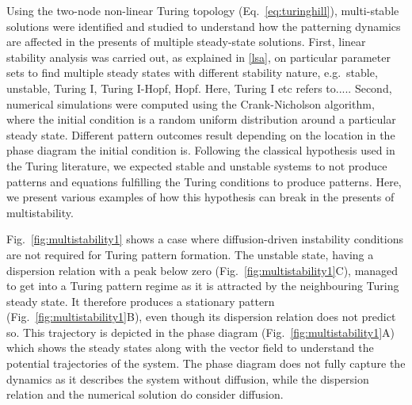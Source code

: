 Using the two-node non-linear Turing topology (Eq.~\ref{eq:turinghill}), multi-stable solutions were identified and studied to understand how the patterning dynamics are affected in the presents of multiple steady-state solutions.
First, linear stability analysis was carried out, as explained in \ref{lsa}, on particular parameter sets to find multiple steady states with different stability nature, e.g.~stable, unstable, Turing I, Turing I-Hopf, Hopf. Here, Turing I etc refers to.....
Second, numerical simulations were computed using the Crank-Nicholson algorithm, where the initial condition is a random uniform distribution around a particular steady state.
Different pattern outcomes result depending on the location in the phase diagram the initial condition is.
Following the classical hypothesis used in the Turing literature, we expected stable and unstable systems to not produce patterns and equations fulfilling the Turing conditions to produce patterns.
Here, we present various examples of how this hypothesis can break in the presents of multistability.

Fig.~\ref{fig:multistability1} shows a case where diffusion-driven instability conditions are not required for Turing pattern formation.
The unstable state, having a dispersion relation with a peak below zero (Fig.~\ref{fig:multistability1}C), managed to get into a Turing pattern regime as it is attracted by the neighbouring Turing steady state.
It therefore produces a stationary pattern (Fig.~\ref{fig:multistability1}B), even though its dispersion relation does not predict so.
This trajectory is depicted in the phase diagram (Fig.~\ref{fig:multistability1}A) which shows the steady states along with the vector field to understand the potential trajectories of the system.
The phase diagram does not fully capture the dynamics as it describes the system without diffusion, while the dispersion relation and the numerical solution do consider diffusion.

